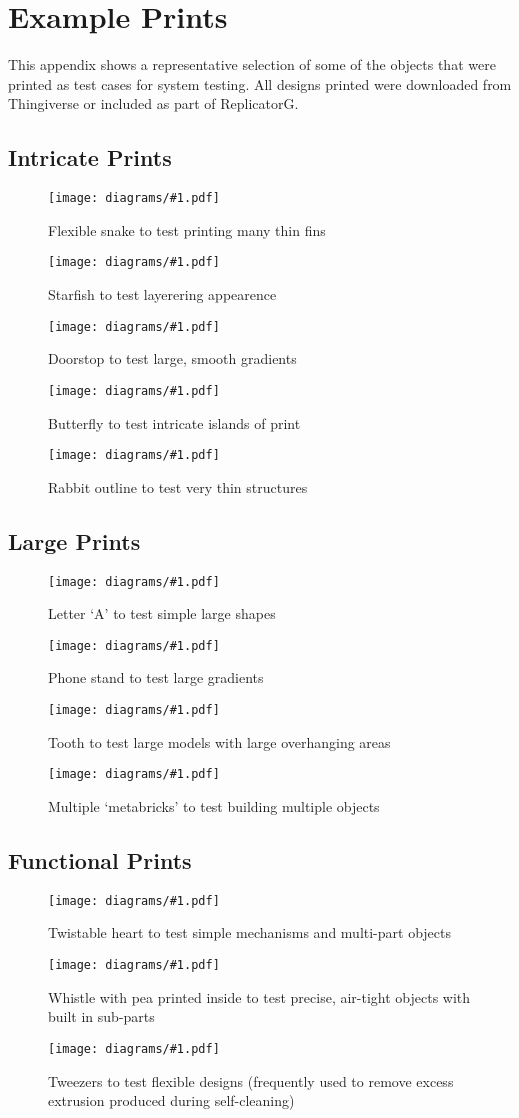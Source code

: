\chapter{Example Prints}
	
	\label{sec:examplePrints}
	
	\newcommand{\examplePrint}[2]{
		\begin{figure}[H]
			\texttt{[image: diagrams/\#1.pdf]}
			\caption{#2}
			\label{fig:#1}
		\end{figure}
	}
	
	This appendix shows a representative selection of some of the objects that
	were printed as test cases for system testing. All designs printed were
	downloaded from Thingiverse or included as part of ReplicatorG.
	
	\section{Intricate Prints}
		
		\examplePrint{snake}{Flexible snake to test printing many thin fins}
		
		\examplePrint{starfish}{Starfish to test layerering appearence}
		
		\examplePrint{doorstop}{Doorstop to test large, smooth gradients}
		
		\examplePrint{butterfly}{Butterfly to test intricate islands of print}
		
		\examplePrint{rabbit}{Rabbit outline to test very thin structures}
		
	\section{Large Prints}
		
		\examplePrint{letter}{Letter `A' to test simple large shapes}
		
		\examplePrint{phoneDock}{Phone stand to test large gradients}
		
		\examplePrint{tooth}{Tooth to test large models with large overhanging areas}
		
		\examplePrint{joblot}{Multiple `metabricks' to test building multiple objects}
		
	\section{Functional Prints}
		
		\examplePrint{heart}{Twistable heart to test simple mechanisms and
		                     multi-part objects}
		
		\examplePrint{whistle}{Whistle with pea printed inside to test precise,
		                       air-tight objects with built in sub-parts}
		
		\examplePrint{tweezers}{Tweezers to test flexible designs (frequently used
		                        to remove excess extrusion produced during
		                        self-cleaning)}
